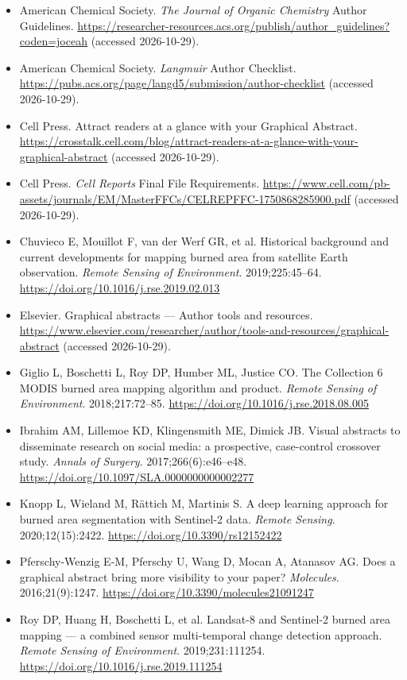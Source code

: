 \begin{itemize}
\item American Chemical Society. \textit{The Journal of Organic Chemistry} Author Guidelines. \url{https://researcher-resources.acs.org/publish/author_guidelines?coden=joceah} (accessed 2026-10-29).
\item American Chemical Society. \textit{Langmuir} Author Checklist. \url{https://pubs.acs.org/page/langd5/submission/author-checklist} (accessed 2026-10-29).
\item Cell Press. Attract readers at a glance with your Graphical Abstract. \url{https://crosstalk.cell.com/blog/attract-readers-at-a-glance-with-your-graphical-abstract} (accessed 2026-10-29).
\item Cell Press. \textit{Cell Reports} Final File Requirements. \url{https://www.cell.com/pb-assets/journals/EM/MasterFFCs/CELREPFFC-1750868285900.pdf} (accessed 2026-10-29).
\item Chuvieco E, Mouillot F, van der Werf GR, et al. Historical background and current developments for mapping burned area from satellite Earth observation. \textit{Remote Sensing of Environment}. 2019;225:45--64. \url{https://doi.org/10.1016/j.rse.2019.02.013}
\item Elsevier. Graphical abstracts — Author tools and resources. \url{https://www.elsevier.com/researcher/author/tools-and-resources/graphical-abstract} (accessed 2026-10-29).
\item Giglio L, Boschetti L, Roy DP, Humber ML, Justice CO. The Collection 6 MODIS burned area mapping algorithm and product. \textit{Remote Sensing of Environment}. 2018;217:72--85. \url{https://doi.org/10.1016/j.rse.2018.08.005}
\item Ibrahim AM, Lillemoe KD, Klingensmith ME, Dimick JB. Visual abstracts to disseminate research on social media: a prospective, case-control crossover study. \textit{Annals of Surgery}. 2017;266(6):e46--e48. \url{https://doi.org/10.1097/SLA.0000000000002277}
\item Knopp L, Wieland M, Rättich M, Martinis S. A deep learning approach for burned area segmentation with Sentinel-2 data. \textit{Remote Sensing}. 2020;12(15):2422. \url{https://doi.org/10.3390/rs12152422}
\item Pferschy-Wenzig E-M, Pferschy U, Wang D, Mocan A, Atanasov AG. Does a graphical abstract bring more visibility to your paper? \textit{Molecules}. 2016;21(9):1247. \url{https://doi.org/10.3390/molecules21091247}
\item Roy DP, Huang H, Boschetti L, et al. Landsat-8 and Sentinel-2 burned area mapping — a combined sensor multi-temporal change detection approach. \textit{Remote Sensing of Environment}. 2019;231:111254. \url{https://doi.org/10.1016/j.rse.2019.111254}
\end{itemize}

